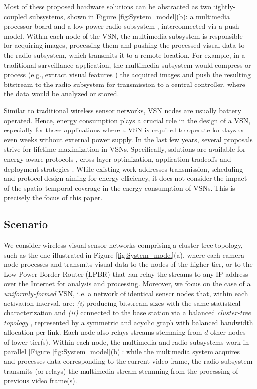 \documentclass[twocolumn,english]{IEEEtran}
\theoremstyle{plain}
\theoremstyle{definition}
\begin{document}
Most of these proposed hardware solutions can be abstracted as two
tightly-coupled subsystems, shown in Figure \ref{fig:System_model}(b):
a multimedia processor board and a low-power radio subsystem \cite{citric,rahimi2005cyclops,hengstler2007mesheye},
interconnected via a push model. Within each node of the VSN, the
multimedia subsystem is responsible for acquiring images, processing
them and pushing the processed visual data to the radio subsystem,
which transmits it to a remote location. For example, in a traditional
surveillance application, the multimedia subsystem would compress
or process (e.g., extract visual features \cite{DBLP:journals/ijcv/Lowe04,DBLP:conf/MMSP/RedondiBCT})
the acquired images and push the resulting bitstream to the radio
subsystem for transmission to a central controller, where the data
would be analyzed or stored. 

Similar to traditional wireless sensor networks, VSN nodes are usually
battery operated. Hence, energy consumption plays a crucial role in
the design of a VSN, especially for those applications where a VSN
is required to operate for days or even weeks without external power
supply. In the last few years, several proposals strive for lifetime
maximization in VSNs. Specifically, solutions are available for energy-aware
protocols \cite{mingorance2010efficient,LeungMACEssentials}, cross-layer
optimization\cite{Tahir2013701}, application tradeoffs \cite{kandris2011energy}
and deployment strategies \cite{Munishwar:2013:CAV:2489253.2489262}.
While existing work addresses transmission, scheduling and protocol
design aiming for energy efficiency, it does not consider the impact
of the spatio--temporal coverage in the energy consumption of VSNs.
This is precisely the focus of this paper.


\subsection{Scenario}

\noindent We consider wireless visual sensor networks comprising a
cluster-tree topology, such as the one illustrated in Figure \ref{fig:System_model}(a),
where each camera node processes and transmits visual data to the
nodes of the higher tier, or to the Low-Power Border Router (LPBR)
\cite{wang2012IPV6} that can relay the streams to any IP address
over the Internet for analysis and processing. Moreover, we focus
on the case of a \emph{uniformly-formed} VSN, i.e. a network of identical
sensor nodes that, within each activation interval, are: \emph{(i)}
producing bitstream sizes with the same statistical characterization
and \emph{(ii)} connected to the base station via a balanced \emph{cluster-tree
topology }\cite{AlvesClusterTreeGTS}, represented by a symmetric
and acyclic graph with balanced bandwidth allocation per link. Each
node also relays streams stemming from $d$ other nodes of lower tier(s).
Within each node, the multimedia and radio subsystems work in parallel
{[}Figure \ref{fig:System_model}(b){]}: while the multimedia system
acquires and processes data corresponding to the current video frame,
the radio subsystem transmits (or relays) the multimedia stream stemming
from the processing of previous video frame(s).
\end{document}
